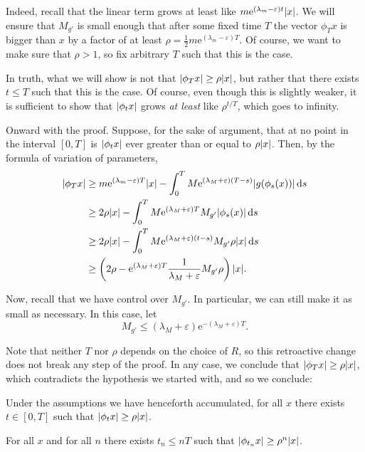 \documentclass{article}
\newcommand{\e}{\mathrm{e}}
\DeclarePairedDelimiter{\abs}{\lvert}{\rvert}
\begin{document}
Indeed, recall that the linear term grows at least like $m \e^{(\lambda_m - \varepsilon) t} \abs{x}$. We will ensure that $M_{g'}$ is small enough that after some fixed time $T$ the vector $\phi_T x$ is bigger than $x$ by a factor of at least $\rho = \frac12 m \e^{(\lambda_m - \varepsilon) T}$. Of course, we want to make sure that $\rho > 1$, so fix arbitrary $T$ such that this is the case.

In truth, what we will show is not that $\abs{\phi_T x} \geq \rho \abs x$, but rather that there exists $t \leq T$ such that this is the case. Of course, even though this is slightly weaker, it is sufficient to show that $\abs{\phi_t x}$ grows \emph{at least} like $\rho^{t/T}$, which goes to infinity.

Onward with the proof. Suppose, for the sake of argument, that at no point in the interval $[0, T]$ is $\abs{\phi_t x}$ ever greater than or equal to $\rho \abs x$. Then, by the formula of variation of parameters,
\begin{align*}
\abs{\phi_T x} &\geq m \e^{(\lambda_m - \varepsilon) T} \abs{x} - \int_0^T M \e^{(\lambda_M + \varepsilon)(T-s)} \abs{g(\phi_s(x))} \dl s\\
&\geq 2\rho \abs{x} - \int_0^T M \e^{(\lambda_M + \varepsilon)T} M_{g'} \abs{\phi_s(x)} \dl s\\
&\geq 2\rho \abs{x} - \int_0^T M \e^{(\lambda_M + \varepsilon)(t-s)} M_{g'} \rho \abs{x} \dl s\\
&\geq \left( 2\rho - \e^{(\lambda_M + \varepsilon)T} \frac1{\lambda_M + \varepsilon} M_{g'} \rho \right) \abs{x}.
\end{align*}

Now, recall that we have control over $M_{g'}$. In particular, we can still make it as small as necessary. In this case, let
\[M_{g'} \leq (\lambda_M + \varepsilon) \e^{-(\lambda_M + \varepsilon) T}.\]

Note that neither $T$ nor $\rho$ depends on the choice of $R$, so this retroactive change does not break any step of the proof. In any case, we conclude that $\abs{\phi_T x} \geq \rho \abs{x}$, which contradicts the hypothesis we started with, and so we conclude:

\begin{Lemma}
Under the assumptions we have henceforth accumulated, for all $x$ there exists $t \in [0,T]$ such that $\abs{\phi_t x} \geq \rho \abs{x}$.
\end{Lemma}

\begin{Corollary}
For all $x$ and for all $n$ there exists $t_n \leq n T$ such that $\abs{\phi_{t_n} x} \geq \rho^n \abs x$.
\end{Corollary}
\end{document}
